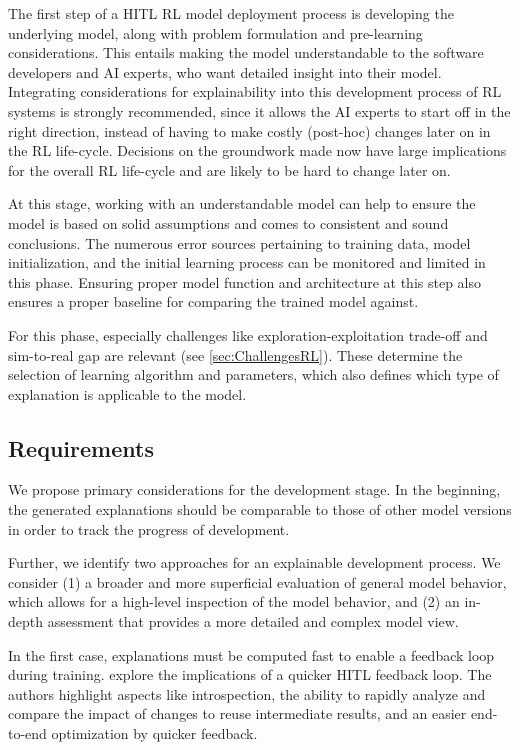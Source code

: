 \documentclass[twoside,11pt]{article}
\begin{document}
\begin{enumerate}
The first step of a HITL RL model deployment process is developing the underlying model, along with problem formulation and pre-learning considerations. This entails making the model understandable to the software developers and AI experts, who want detailed insight into their model. 
Integrating considerations for explainability into this development process of RL systems is strongly recommended, since it allows the AI experts to start off in the right direction, instead of having to make costly (post-hoc) changes later on in the RL life-cycle. Decisions on the groundwork made now have large implications for the overall RL life-cycle and are likely to be hard to change later on.

At this stage, working with an understandable model can help to ensure the model is based on solid assumptions and comes to consistent and sound conclusions. The numerous error sources pertaining to training data, model initialization, and the initial learning process can be monitored and limited in this phase. Ensuring proper model function and architecture at this step also ensures a proper baseline for comparing the trained model against.

For this phase, especially challenges like exploration-exploitation trade-off and sim-to-real gap are relevant (see \ref{sec:ChallengesRL}). These determine the selection of learning algorithm and parameters, which also defines which type of explanation is applicable to the model.

\subsection{Requirements}

We propose primary considerations for the development stage. In the beginning, the generated explanations should be comparable to those of other model versions in order to track the progress of development. 

Further, we identify two approaches for an explainable development process. We consider (1) a broader and more superficial evaluation of general model behavior, which allows for a high-level inspection of the model behavior, and (2) an in-depth assessment that provides a more detailed and complex model view.

In the first case, explanations must be computed fast to enable a feedback loop during training. \citet{XinEtAl:2018:HITLMLFeedbackLoop} explore the implications of a quicker HITL feedback loop. The authors highlight aspects like introspection, the ability to rapidly analyze and compare the impact of changes to reuse intermediate results, and an easier end-to-end optimization by quicker feedback.


\end{enumerate}
\end{document}
